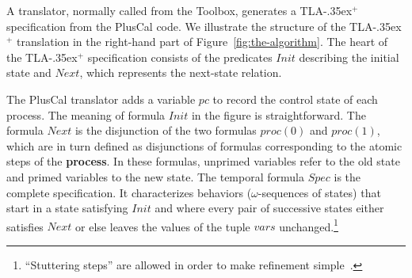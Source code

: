 \documentclass[a4paper,draft]{llncs}
\newcommand{\tlaplus}{\mbox{TLA\kern -.35ex$^+$}\xspace}
\begin{document}
A 
translator, normally called from the Toolbox,
generates a \tlaplus
specification from the PlusCal code. We illustrate the
structure of the \tlaplus translation in the right-hand part of
Figure~\ref{fig:the-algorithm}. 
%
The heart of the \tlaplus specification consists of the predicates
$Init$ describing the initial state and $Next$,
which represents the next-state relation. 

The PlusCal translator adds a variable $pc$ to record the control state of each
process.
The meaning of formula $Init$ in the figure is straightforward. The formula
$Next$ is the disjunction of the two formulas $proc(0)$ and $proc(1)$, which are
in turn defined as disjunctions of formulas corresponding to the atomic steps of
the \textbf{process}. 
In these formulas, unprimed variables
refer to the old state and primed variables to the new state.
%
The temporal formula $Spec$ is the complete specification. It characterizes
behaviors ($\omega$-sequences of states) that start in a state satisfying
$Init$ and where every pair of successive states either satisfies $Next$ or else
leaves the values of the tuple $vars$ unchanged.\footnote{``Stuttering steps''
  are allowed in order to make refinement simple~\cite{lamport:what-good}.}


\end{document}
